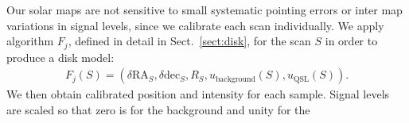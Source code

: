 \documentclass{aa}
\newcommand{\eqnl}[2]{\begin{eqnarray}\label{#1}#2\end{eqnarray}}
\newcommand{\s}[2]{{#1}_{\mathrm{#2}}}
\begin{document}
%
Our solar maps are not sensitive to small systematic pointing errors or inter map variations in signal levels, since we calibrate each scan individually.
We apply algorithm $F_j$,
defined in detail in Sect.~\ref{sect:disk},
for the scan $S$ in order to produce a disk model:
\eqnl{disk_model}{
F_j(S) = \left( \delta \mathrm{RA}_S, \delta \mathrm{dec}_S, R_S, \s{u}{background}(S), \s{u}{QSL}(S) \right) \text{.}
}
We then obtain calibrated position and intensity for each sample. Signal levels are scaled so that zero is for the background and unity for the 
\end{document}

